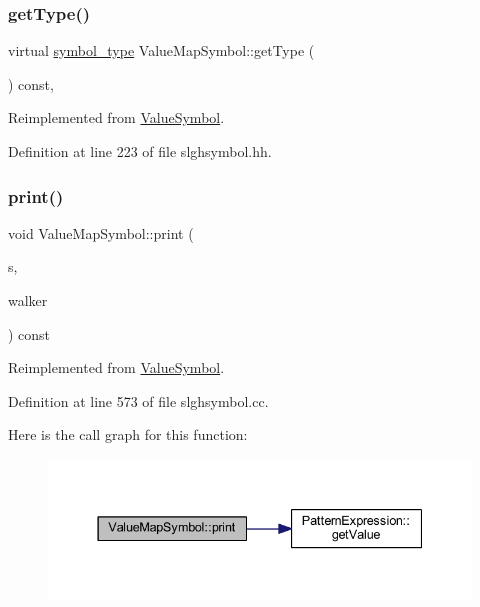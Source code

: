 \subsubsection{\texorpdfstring{getType()}{getType()}}
{\footnotesize\ttfamily virtual \mbox{\hyperlink{class_sleigh_symbol_aba70f7f332fd63488c5ec4bd7807db41}{symbol\+\_\+type}} Value\+Map\+Symbol\+::get\+Type (\begin{DoxyParamCaption}\item[{void}]{ }\end{DoxyParamCaption}) const\hspace{0.3cm}{\ttfamily [inline]}, {\ttfamily [virtual]}}



Reimplemented from \mbox{\hyperlink{class_value_symbol_aa134aca647315ca414f6e4e4a246c9ae}{Value\+Symbol}}.



Definition at line 223 of file slghsymbol.\+hh.

\mbox{\label{class_value_map_symbol_a706eaaae2c92d3927855bc34d10f2cc1}} 
\subsubsection{\texorpdfstring{print()}{print()}}
{\footnotesize\ttfamily void Value\+Map\+Symbol\+::print (\begin{DoxyParamCaption}\item[{ostream \&}]{s,  }\item[{\mbox{\hyperlink{class_parser_walker}{Parser\+Walker}} \&}]{walker }\end{DoxyParamCaption}) const\hspace{0.3cm}{\ttfamily [virtual]}}



Reimplemented from \mbox{\hyperlink{class_value_symbol_a82b3d3fbfc6d3ed118103f12220cdfd4}{Value\+Symbol}}.



Definition at line 573 of file slghsymbol.\+cc.

Here is the call graph for this function\+:
\nopagebreak
\begin{figure}[H]
\begin{center}
\leavevmode
\includegraphics[width=337pt]{class_value_map_symbol_a706eaaae2c92d3927855bc34d10f2cc1_cgraph}
\end{center}
\end{figure}
\mbox{\label{class_value_map_symbol_a7287386595bd0d870f78e83490637c53}} 
